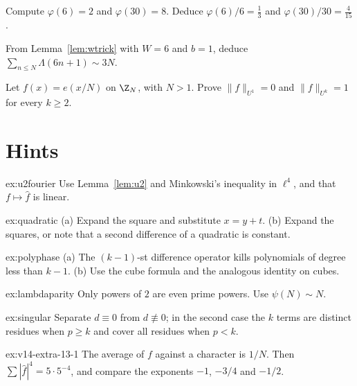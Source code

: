 \begin{exercise}[$\star$]\label{ex:v14-extra-13-2}
Compute $\varphi(6)=2$ and $\varphi(30)=8$. Deduce $\varphi(6)/6=\frac13$ and $\varphi(30)/30=\frac4{15}$.
\end{exercise}

\begin{exercise}[$\star\star$]\label{ex:v14-extra-13-3}
From Lemma~\ref{lem:wtrick} with $W=6$ and $b=1$, deduce $\sum_{n\le N}\Lambda(6n+1)\sim3N$.
\end{exercise}

\begin{exercise}[$\star\star\star$]\label{ex:v14-extra-13-4}
Let $f(x)=e(x/N)$ on $\Z_N$, with $N>1$. Prove $\|f\|_{U^1}=0$ and $\|f\|_{U^k}=1$ for every $k\ge2$.
\end{exercise}

\section{Hints}

\begin{hint}{ex:u2fourier}
Use Lemma~\ref{lem:u2} and Minkowski's inequality in $\ell^4$, and that $f\mapsto\hat f$ is linear.
\end{hint}

\begin{hint}{ex:quadratic}
(a) Expand the square and substitute $x=y+t$. (b) Expand the squares, or note that a second difference of a quadratic is constant.
\end{hint}

\begin{hint}{ex:polyphase}
(a) The $(k-1)$-st difference operator kills polynomials of degree less than $k-1$. (b) Use the cube formula and the analogous identity on cubes.
\end{hint}

\begin{hint}{ex:lambdaparity}
Only powers of $2$ are even prime powers. Use $\psi(N)\sim N$.
\end{hint}

\begin{hint}{ex:singular}
Separate $d\equiv0$ from $d\not\equiv0$; in the second case the $k$ terms are distinct residues when $p\ge k$ and cover all residues when $p<k$.
\end{hint}

\begin{hint}{ex:v14-extra-13-1}
The average of $f$ against a character is $1/N$. Then $\sum|\hat f|^4=5\cdot5^{-4}$, and compare the exponents $-1$, $-3/4$ and $-1/2$.
\end{hint}

